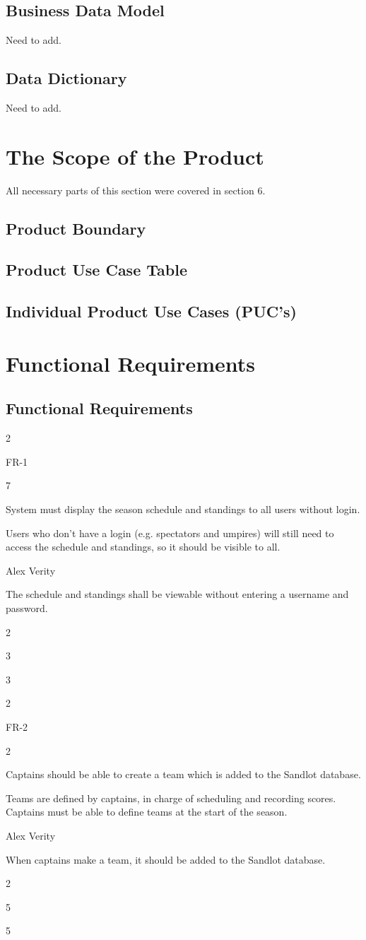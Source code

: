 \documentclass[12pt]{article}
\newenvironment{myreq}[1]{%
\setlist[description]{font=\normalfont\color{darkgray}}%
\begin{tcolorbox}[colframe=black,colback=white, sharp corners, boxrule=1pt]%
\bfseries\color{blue}%
\begin{description}#1}%
{\end{description}\end{tcolorbox}}
\newcommand{\twoinline}[2]{\begin{multicols}{2}#1 #2\end{multicols}}
\newcommand{\reqno}{\item[Requirement \#:]}
\newcommand{\reqevent}{\item[Event/BUC/PUC \#:]}
\newcommand{\reqdesc}{\item[Description:]}
\newcommand{\reqrat}{\item[Rationale:]}
\newcommand{\reqorig}{\item[Originator:]}
\newcommand{\reqfit}{\item[Fit Criterion:]}
\newcommand{\reqsatis}{\item[Customer Satisfaction:]}
\newcommand{\reqdissat}{\item[Customer Dissatisfaction:]}
\begin{document}
\subsection{Business Data Model}
Need to add.

\subsection{Data Dictionary}
Need to add.

\section{The Scope of the Product}
All necessary parts of this section were covered in section 6.
\subsection{Product Boundary}

\subsection{Product Use Case Table}

\subsection{Individual Product Use Cases (PUC's)}


\section{Functional Requirements}
\subsection{Functional Requirements}

\begin{myreq}
  \twoinline
    {\reqno FR-1}
    {\reqevent 7}
  \reqdesc System must display the season schedule and standings to all users
  without login.
  \reqrat Users who don't have a login (e.g. spectators and umpires) will still
  need to access the schedule and standings, so it should be visible to all.
  \reqorig Alex Verity
  \reqfit The schedule and standings shall be viewable without entering a
  username and password.
  \twoinline
    {\reqsatis 3}
    {\reqdissat 3}
\end{myreq}

\begin{myreq}
  \twoinline
    {\reqno FR-2}
    {\reqevent 2}
  \reqdesc Captains should be able to create a team which is added to the
  Sandlot database.
  \reqrat Teams are defined by captains, in charge of scheduling and
  recording scores. Captains must be able to define teams at the start of the
  season.
  \reqorig Alex Verity
  \reqfit When captains make a team, it should be added to the Sandlot
  database.
  \twoinline
    {\reqsatis 5}
    {\reqdissat 5}
\end{myreq}
\end{document}
